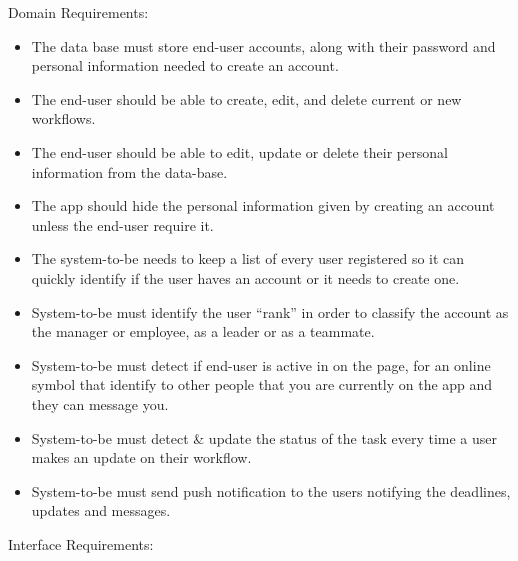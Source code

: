 \documentclass{article}[draft]
\begin{document}
Domain Requirements:
\begin{itemize}
    \item The data base must store end-user accounts, along with their password and personal information needed to create an account.
    \item The end-user should be able to create, edit, and delete current or new workflows.
    \item The end-user should be able to edit, update or delete their personal information from the data-base.
    \item The app should hide the personal information given by creating an account unless the end-user require it.
    \item The system-to-be needs to keep a list of every user registered so it can quickly identify if the user haves an account or it needs to create one.
    \item System-to-be must identify the user ``rank'' in order to classify the account as the manager or employee, as a leader or as a teammate.
    \item System-to-be must detect if end-user is active in on the page, for an online symbol that identify to other people that you are currently on the app and they can message you.
    \item System-to-be must detect \& update the status of the task every time a user makes an update on their workflow.
    \item System-to-be must send push notification to the users notifying the deadlines, updates and messages.
\end{itemize}
\vspace{30pt}
Interface Requirements:
\end{document}
